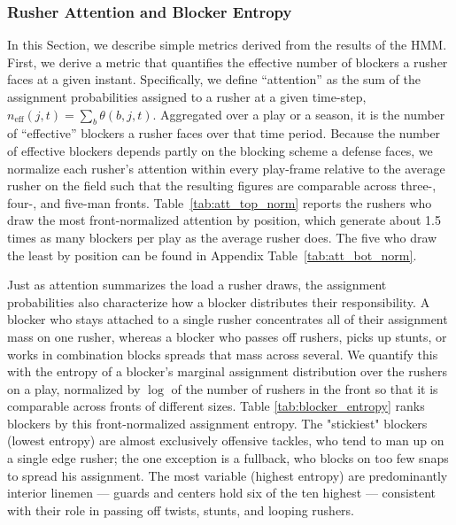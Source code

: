 \documentclass[USenglish]{article}
\theoremstyle{dgthm}
\theoremstyle{dgdef}
\begin{document}
\subsubsection{Rusher Attention and Blocker Entropy}
\label{sec:attention}

In this Section, we describe simple metrics derived from the results of the HMM.  First, we derive a metric that quantifies the effective number of blockers a rusher faces at a given instant.  Specifically, we define ``attention'' as the sum of the assignment probabilities assigned to a rusher at a given time-step, $n_{\text{eff}}(j,t)=\sum_b \theta(b,j,t)$. Aggregated over a play or a season, it is the number of ``effective'' blockers a rusher faces over that time period. Because the number of effective blockers depends partly on the blocking scheme a defense faces, we normalize each rusher's attention within every play-frame relative to the average rusher on the field such that the resulting figures are comparable across three-, four-, and five-man fronts. Table~\ref{tab:att_top_norm} reports the rushers who draw the most front-normalized attention by position, which generate about 1.5 times as many blockers per play as the average rusher does. The five who draw the least by position can be found in Appendix Table~\ref{tab:att_bot_norm}.




Just as attention summarizes the load a rusher draws, the assignment probabilities also characterize how a blocker distributes their responsibility. A blocker who stays attached to a single rusher concentrates all of their assignment mass on one rusher, whereas a blocker who passes off rushers, picks up stunts, or works in combination blocks spreads that mass across several. We quantify this with the entropy of a blocker's marginal assignment distribution over the rushers on a play, normalized by $\log$ of the number of rushers in the front so that it is comparable across fronts of different sizes. Table \ref{tab:blocker_entropy} ranks blockers by this front-normalized assignment entropy. The "stickiest" blockers (lowest entropy) are almost exclusively offensive tackles, who tend to man up on a single edge rusher; the one exception is a fullback, who blocks on too few snaps to spread his assignment. The most variable (highest entropy) are predominantly interior linemen --- guards and centers hold six of the ten highest --- consistent with their role in passing off twists, stunts, and looping rushers.
\end{document}
